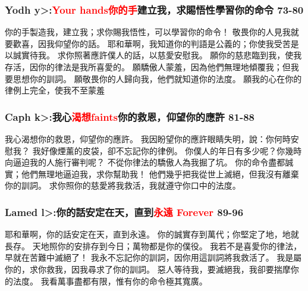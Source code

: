 \subsubsection{Yodh  \<y>:\textcolor{red}{Your hands你的手}建立我，求賜悟性學習你的命令 73-80}
你的手製造我，建立我；求你賜我悟性，可以學習你的命令！ 
敬畏你的人見我就要歡喜，因我仰望你的話。 
耶和華啊，我知道你的判語是公義的；你使我受苦是以誠實待我。 
求你照著應許僕人的話，以慈愛安慰我。 
願你的慈悲臨到我，使我存活，因你的律法是我所喜愛的。 
願驕傲人蒙羞，因為他們無理地傾覆我；但我要思想你的訓詞。 
願敬畏你的人歸向我，他們就知道你的法度。 
願我的心在你的律例上完全，使我不至蒙羞



\subsubsection{Caph  \<k>:我心\textcolor{red}{渴想faints}你的救恩，仰望你的應許 81-88}
我心渴想你的救恩，仰望你的應許。
我因盼望你的應許眼睛失明，說：你何時安慰我？
我好像煙薰的皮袋，卻不忘記你的律例。
你僕人的年日有多少呢？你幾時向逼迫我的人施行審判呢？
不從你律法的驕傲人為我掘了坑。
你的命令盡都誠實；他們無理地逼迫我，求你幫助我！
他們幾乎把我從世上滅絕，但我沒有離棄你的訓詞。
求你照你的慈愛將我救活，我就遵守你口中的法度。


\subsubsection{Lamed  \<l>:你的話安定在天，直到\textcolor{red}{永遠 Forever} 89-96}
耶和華啊，你的話安定在天，直到永遠。
你的誠實存到萬代；你堅定了地，地就長存。
天地照你的安排存到今日；萬物都是你的僕役。
我若不是喜愛你的律法，早就在苦難中滅絕了！
我永不忘記你的訓詞，因你用這訓詞將我救活了。
我是屬你的，求你救我，因我尋求了你的訓詞。
惡人等待我，要滅絕我，我卻要揣摩你的法度。
我看萬事盡都有限，惟有你的命令極其寬廣。


